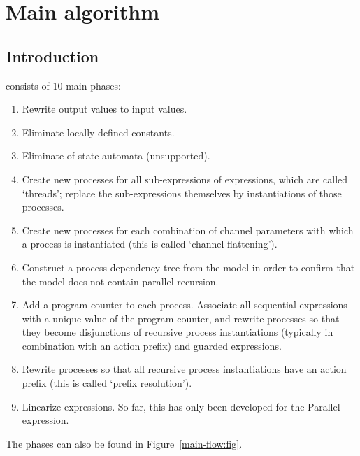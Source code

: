 \chapter{Main algorithm}

\section*{Introduction}

\lpeq{} consists of 10 main phases:
\begin{enumerate}[1.]
\item Rewrite output values to input values.
\item Eliminate locally defined constants.
\item Eliminate of state automata (unsupported).
\item Create new processes for all sub-expressions of \pedi{} expressions, which are called `threads'; replace the sub-expressions themselves by instantiations of those processes.
\item Create new processes for each combination of channel parameters with which a process is instantiated (this is called `channel flattening').
\item Construct a process dependency tree from the model in order to confirm that the model does not contain parallel recursion.
\item Add a program counter to each process.
Associate all sequential expressions with a unique value of the program counter, and rewrite processes so that they become disjunctions of recursive process instantiations (typically in combination with an action prefix) and guarded \pedi{} expressions.
\item Rewrite processes so that all recursive process instantiations have an action prefix (this is called `prefix resolution').
\item Linearize \pedi{} expressions.
So far, this has only been developed for the Parallel expression.
\end{enumerate}

The phases can also be found in Figure~\ref{main-flow:fig}.


